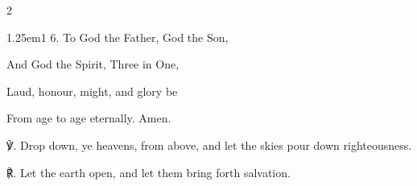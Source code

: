 \begin{multicols}{2}
\begin{hangparas}{1.25em}{1}
6. To God the Father, God the Son,

And God the Spirit, Three in One,

Laud, honour, might, and glory be

From age to age eternally. Amen.\\
\end{hangparas}

℣. Drop down, ye heavens, from above, and let the skies pour down righteousness.

℟. Let the earth open, and let them bring forth salvation.


\fussy
\end{multicols}

\mattins


